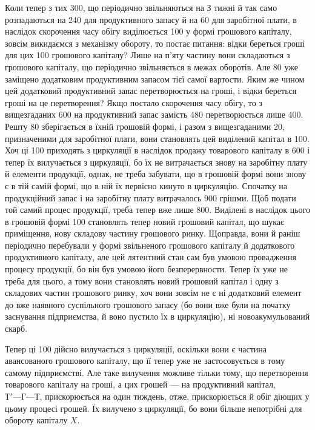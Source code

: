 Коли тепер з тих 300, що періодично звільняються на З
тижні й так само розпадаються на 240 для продуктивного запасу
й на 60 для заробітної плати, в наслідок скорочення часу
обігу виділюється 100 у формі грошового капіталу, зовсім викидаємся
з механізму обороту, то постає питання: відки береться гроші
для цих 100 грошового капіталу? Лише на п’яту частину вони
складаються з грошового капіталу, що періодично звільняється в межах
оборотів. Але  \deq{} 80 уже заміщено додатковим продуктивним
запасом тієї самої вартости. Яким же чином цей додатковий продуктивний
запас перетворюється на гроші, і відки береться гроші на це перетворення?
Якщо постало скорочення часу обігу, то з вищезгаданих 600
на продуктивний запас замість 480 перетворюється лише 400. Решту 80 зберігається в їхній грошовій формі, і
разом з вищезгаданими 20, призначеними для заробітної плати,
вони становлять цей виділений капітал в 100. Хоч ці 100 приходять з циркуляції в наслідок продажу товарового капіталу в
600 і тепер їх вилучається з циркуляції, бо їх не витрачається
знову на заробітну плату й елементи продукції, однак, не треба забувати,
що в грошовій формі вони знову є в тій самій формі, що в ній їх
первісно кинуто в циркуляцію. Спочатку на продукційний запас і на заробітну
плату витрачалось 900 грішми. Щоб подати той
самий процес продукції, треба тепер вже лише 800. Виділені в
наслідок цього в грошовій формі 100 становлять тепер новий
грошовий капітал, що шукає приміщення, нову складову частину грошового
ринку. Щоправда, вони й раніш періодично перебували у формі
звільненого грошового капіталу й додаткового продуктивного капіталу,
але цей лятентний стан сам був умовою провадження процесу продукції,
бо він був умовою його безперервности. Тепер їх уже не треба для
цього, а тому вони становлять новий грошовий капітал і одну з складових
частин грошового ринку, хоч вони зовсім не є ні додатковий елемент
до вже наявного суспільного грошового запасу (бо вони вже були
на початку заснування підприємства, й воно пустило їх в циркуляцію),
ні новоакумульований скарб.

Тепер ці 100 дійсно вилучається з циркуляції, оскільки вони
є частина авансованого грошового капіталу, що її тепер уже не застосовується
в тому самому підприємстві. Але таке вилучення можливе
тільки тому, що перетворення товарового капіталу на гроші, а цих грошей
— на продуктивний капітал, $Т' — Г — Т$, прискорюється на один тиждень,
отже, прискорюється й обіг діющих у цьому процесі грошей. Їх вилучено
з циркуляції, бо вони більше непотрібні для обороту капіталу $X$.


